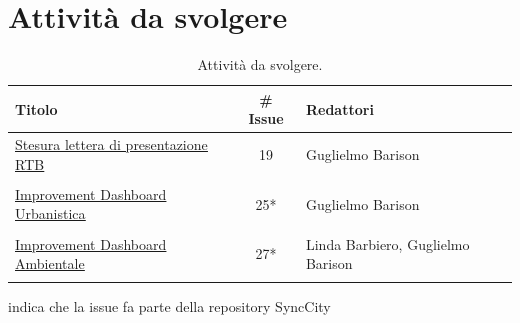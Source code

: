 \documentclass[8pt]{article}
\begin{document}
\section{Attività da svolgere}
\begin{table}[ht!]
	\centering
	\begin{tabular}{p{7cm}cp{7cm}}
		\toprule
		\textbf{Titolo} & \textbf{\# Issue} & \textbf{Redattori} \\
		\midrule
		\href{https://github.com/NaN1fy/docs/issues/19}{\underline{Stesura lettera di presentazione RTB}} & 19 & Guglielmo Barison \\\\
		\href{https://github.com/NaN1fy/SyncCity/issues/25}{\underline{Improvement Dashboard Urbanistica}} & 25*\tnote{*} & Guglielmo Barison \\\\
		\href{https://github.com/NaN1fy/SyncCity/issues/27}{\underline{Improvement Dashboard Ambientale}} & 27*\tnote{*} & Linda Barbiero, Guglielmo Barison \\\\
		\bottomrule
	\end{tabular}
	\begin{tablenotes}
		\vspace{1em}
		\item * indica che la issue fa parte della repository SyncCity
	\end{tablenotes}
	\caption{Attività da svolgere.}
	\label{table:Attivita da svolgere}
\end{table}
\end{document}
